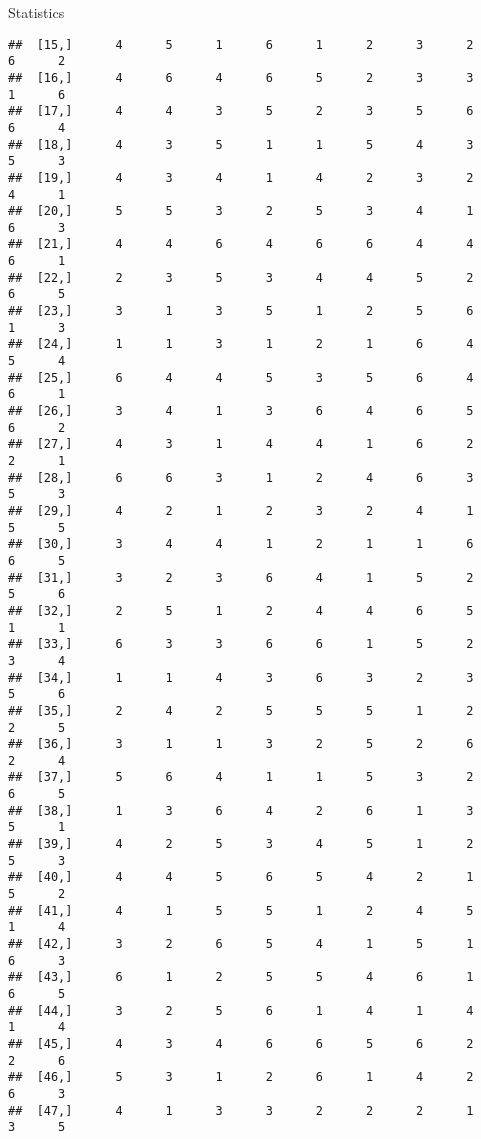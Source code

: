 \documentclass[
  ignorenonframetext,
]{beamer}
\begin{document}
\begin{frame}[fragile]{Statistics}
\begin{verbatim}
##  [15,]      4      5      1      6      1      2      3      2      6      2
##  [16,]      4      6      4      6      5      2      3      3      1      6
##  [17,]      4      4      3      5      2      3      5      6      6      4
##  [18,]      4      3      5      1      1      5      4      3      5      3
##  [19,]      4      3      4      1      4      2      3      2      4      1
##  [20,]      5      5      3      2      5      3      4      1      6      3
##  [21,]      4      4      6      4      6      6      4      4      6      1
##  [22,]      2      3      5      3      4      4      5      2      6      5
##  [23,]      3      1      3      5      1      2      5      6      1      3
##  [24,]      1      1      3      1      2      1      6      4      5      4
##  [25,]      6      4      4      5      3      5      6      4      6      1
##  [26,]      3      4      1      3      6      4      6      5      6      2
##  [27,]      4      3      1      4      4      1      6      2      2      1
##  [28,]      6      6      3      1      2      4      6      3      5      3
##  [29,]      4      2      1      2      3      2      4      1      5      5
##  [30,]      3      4      4      1      2      1      1      6      6      5
##  [31,]      3      2      3      6      4      1      5      2      5      6
##  [32,]      2      5      1      2      4      4      6      5      1      1
##  [33,]      6      3      3      6      6      1      5      2      3      4
##  [34,]      1      1      4      3      6      3      2      3      5      6
##  [35,]      2      4      2      5      5      5      1      2      2      5
##  [36,]      3      1      1      3      2      5      2      6      2      4
##  [37,]      5      6      4      1      1      5      3      2      6      5
##  [38,]      1      3      6      4      2      6      1      3      5      1
##  [39,]      4      2      5      3      4      5      1      2      5      3
##  [40,]      4      4      5      6      5      4      2      1      5      2
##  [41,]      4      1      5      5      1      2      4      5      1      4
##  [42,]      3      2      6      5      4      1      5      1      6      3
##  [43,]      6      1      2      5      5      4      6      1      6      5
##  [44,]      3      2      5      6      1      4      1      4      1      4
##  [45,]      4      3      4      6      6      5      6      2      2      6
##  [46,]      5      3      1      2      6      1      4      2      6      3
##  [47,]      4      1      3      3      2      2      2      1      3      5

\end{verbatim}
\end{frame}
\end{document}
